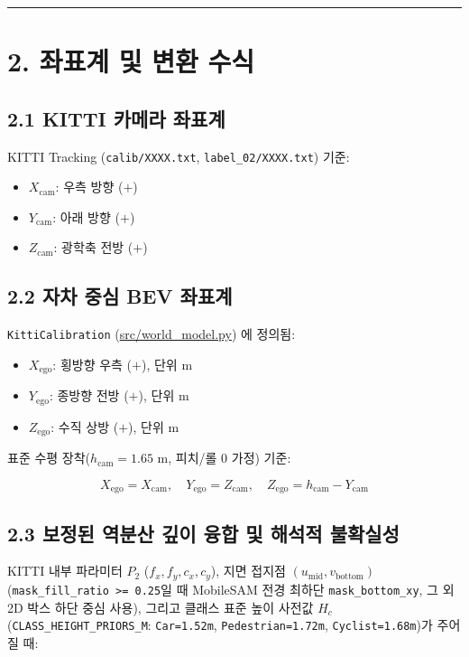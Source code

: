 \documentclass[10.5pt,a4paper]{article}
\begin{document}
\par\noindent\rule{\textwidth}{0.4pt}\par\medskip

\section{2. 좌표계 및 변환 수식}

\subsection{2.1 KITTI 카메라 좌표계}
KITTI Tracking (\texttt{calib/\allowbreak{}XXXX.\allowbreak{}txt}, \texttt{label\_\allowbreak{}02/\allowbreak{}XXXX.\allowbreak{}txt}) 기준:

\begin{itemize}[leftmargin=1.5em,itemsep=2pt]
\item $X_{\text{cam}}$: 우측 방향 ($+$)
\item $Y_{\text{cam}}$: 아래 방향 ($+$)
\item $Z_{\text{cam}}$: 광학축 전방 ($+$)
\end{itemize}

\subsection{2.2 자차 중심 BEV 좌표계}
\texttt{KittiCalibration} (\href{https://github.com/Heisnotanimposter/Totalcare\_autonomous\_driving\_Yolov5/blob/main/src/world\_model.py}{src/world\_model.py}) 에 정의됨:

\begin{itemize}[leftmargin=1.5em,itemsep=2pt]
\item $X_{\text{ego}}$: 횡방향 우측 ($+$), 단위 m
\item $Y_{\text{ego}}$: 종방향 전방 ($+$), 단위 m
\item $Z_{\text{ego}}$: 수직 상방 ($+$), 단위 m
\end{itemize}

표준 수평 장착($h_{\text{cam}} = 1.65\text{ m}$, 피치/롤 0 가정) 기준:

\[X_{\text{ego}} = X_{\text{cam}}, \quad Y_{\text{ego}} = Z_{\text{cam}}, \quad Z_{\text{ego}} = h_{\text{cam}} - Y_{\text{cam}}\]

\subsection{2.3 보정된 역분산 깊이 융합 및 해석적 불확실성}
KITTI 내부 파라미터 $P_2$ ($f_x, f_y, c_x, c_y$), 지면 접지점 $(u_{\text{mid}}, v_{\text{bottom}})$ (\texttt{mask\_\allowbreak{}fill\_\allowbreak{}ratio >= 0.\allowbreak{}25}일 때 MobileSAM 전경 최하단 \texttt{mask\_\allowbreak{}bottom\_\allowbreak{}xy}, 그 외 2D 박스 하단 중심 사용), 그리고 클래스 표준 높이 사전값 $H_c$ (\texttt{CLASS\_\allowbreak{}HEIGHT\_\allowbreak{}PRIORS\_\allowbreak{}M}: \texttt{Car=1.\allowbreak{}52m}, \texttt{Pedestrian=1.\allowbreak{}72m}, \texttt{Cyclist=1.\allowbreak{}68m})가 주어질 때:
\end{document}
